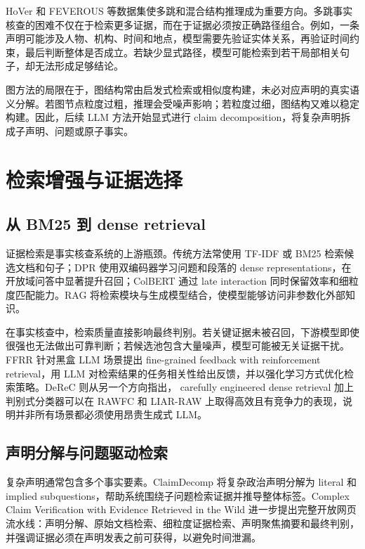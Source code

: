 \documentclass[UTF8,a4paper,zihao=5,twocolumn]{ctexart}
\begin{document}
HoVer 和 FEVEROUS 等数据集使多跳和混合结构推理成为重要方向。多跳事实核查的困难不仅在于检索更多证据，而在于证据必须按正确路径组合。例如，一条声明可能涉及人物、机构、时间和地点，模型需要先验证实体关系，再验证时间约束，最后判断整体是否成立。若缺少显式路径，模型可能检索到若干局部相关句子，却无法形成足够结论。

图方法的局限在于，图结构常由启发式检索或相似度构建，未必对应声明的真实语义分解。若图节点粒度过粗，推理会受噪声影响；若粒度过细，图结构又难以稳定构建。因此，后续 LLM 方法开始显式进行 claim decomposition，将复杂声明拆成子声明、问题或原子事实。

\section{检索增强与证据选择}

\subsection{从 BM25 到 dense retrieval}

证据检索是事实核查系统的上游瓶颈。传统方法常使用 TF-IDF 或 BM25 检索候选文档和句子；DPR 使用双编码器学习问题和段落的 dense representations，在开放域问答中显著提升召回\cite{Karpukhin2020DPR}；ColBERT 通过 late interaction 同时保留效率和细粒度匹配能力\cite{Khattab2020ColBERT}。RAG 将检索模块与生成模型结合，使模型能够访问非参数化外部知识\cite{Lewis2020RAG}。

在事实核查中，检索质量直接影响最终判别。若关键证据未被召回，下游模型即使很强也无法做出可靠判断；若候选池包含大量噪声，模型可能被无关证据干扰。FFRR 针对黑盒 LLM 场景提出 fine-grained feedback with reinforcement retrieval，用 LLM 对检索结果的任务相关性给出反馈，并以强化学习方式优化检索策略\cite{Zhang2024FFRR}。DeReC 则从另一个方向指出， carefully engineered dense retrieval 加上判别式分类器可以在 RAWFC 和 LIAR-RAW 上取得高效且有竞争力的表现，说明并非所有场景都必须使用昂贵生成式 LLM\cite{Qazi2025DeReC}。

\subsection{声明分解与问题驱动检索}

复杂声明通常包含多个事实要素。ClaimDecomp 将复杂政治声明分解为 literal 和 implied subquestions，帮助系统围绕子问题检索证据并推导整体标签\cite{Chen2022ClaimDecomp}。Complex Claim Verification with Evidence Retrieved in the Wild 进一步提出完整开放网页流水线：声明分解、原始文档检索、细粒度证据检索、声明聚焦摘要和最终判别，并强调证据必须在声明发表之前可获得，以避免时间泄漏\cite{Chen2023WildEvidence}。
\end{document}
